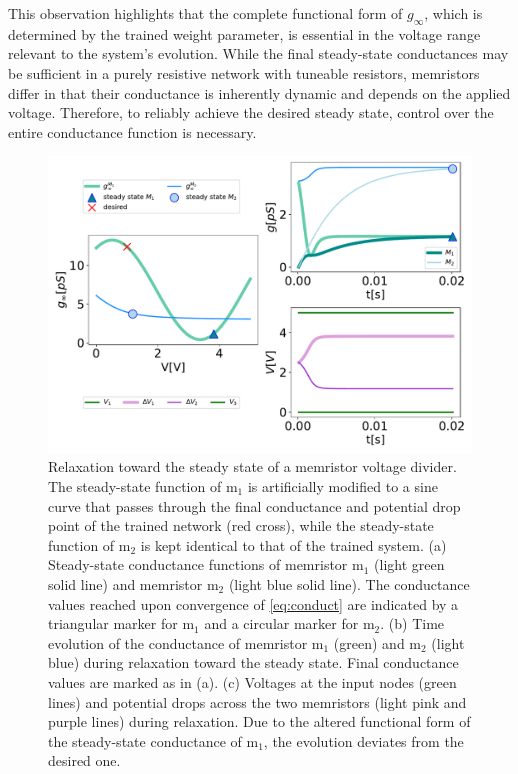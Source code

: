 \documentclass[reprint,superscriptaddress,prb,showkeys]{revtex4-2}
\newcommand{\m}{\text{m}} %
\begin{document}
This observation highlights that the complete functional form of $g_{\infty}$, which is determined by the trained weight parameter, is essential in the voltage range relevant to the system’s evolution. While the final steady-state conductances may be sufficient in a purely resistive network with tuneable resistors, memristors differ in that their conductance is inherently dynamic and depends on the applied voltage. Therefore, to reliably achieve the desired steady state, control over the entire conductance function is necessary.

\begin{figure}[h]
    \centering
    \includegraphics[width=\columnwidth]{plots/appendixA/grid_trained_change_func.pdf}
    \caption{Relaxation toward the steady state of a memristor voltage divider. The steady-state function of $\m_1$ is artificially modified to a sine curve that passes through the final conductance and potential drop point of the trained network (red cross), while the steady-state function of $\m_2$ is kept identical to that of the trained system. (a) Steady-state conductance functions of memristor $\m_1$ (light green solid line) and memristor $\m_2$ (light blue solid line). The conductance values reached upon convergence of \cref{eq:conduct} are indicated by a triangular marker for $\m_1$ and a circular marker for $\m_2$. (b) Time evolution of the conductance of memristor $\m_1$ (green) and $\m_2$ (light blue) during relaxation toward the steady state. Final conductance values are marked as in (a). (c) Voltages at the input nodes (green lines) and potential drops across the two memristors (light pink and purple lines) during relaxation. Due to the altered functional form of the steady-state conductance of $\m_1$, the evolution deviates from the desired one.
    }
    \label{fig:changed_func_ginfty}
\end{figure} 



\clearpage
 

\end{document}
